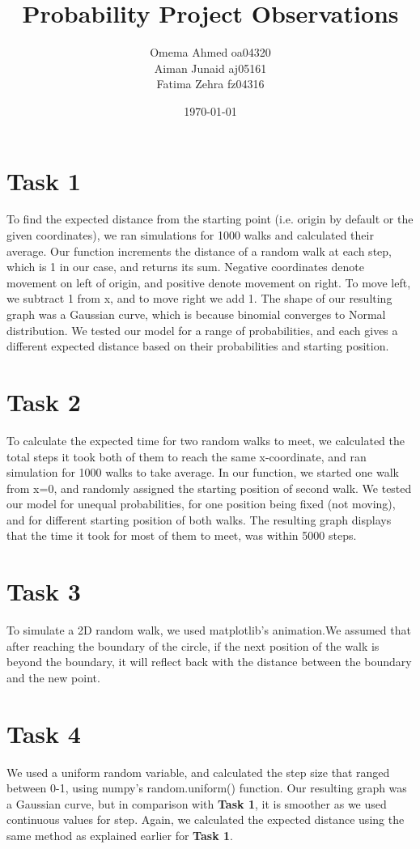 \documentclass{article}
\title{Probability Project Observations}
\author{Omema Ahmed oa04320 \\ Aiman Junaid aj05161 \\ Fatima Zehra fz04316}
\date{\today}
\begin{document}
    \maketitle
    \section*{Task 1}
    To find the expected distance from the starting point (i.e. origin by default or the given coordinates), we ran simulations for 1000 walks and calculated their average.
    Our function increments the distance of a random walk at each step, which is 1 in our case, and returns its sum. Negative coordinates denote movement on left of origin, 
    and positive denote movement on right. To move left, we subtract 1 from x, and to move right we add 1.
    The shape of our resulting graph was a Gaussian curve, which is because binomial converges to Normal distribution. %
    We tested our model for a range of probabilities, and each gives a different expected distance based on their probabilities and starting position.

    \section*{Task 2}
    To calculate the expected time for two random walks to meet, we calculated the total steps it took both of them to reach the same x-coordinate, and ran simulation for 1000 walks to take average.
    In our function, we started one walk from x=0, and randomly assigned the starting position of second walk. We tested our model for unequal probabilities, for one position being fixed (not moving), 
    and for different starting position of both walks.
    The resulting graph displays that the time it took for most of them to meet, was within 5000 steps.
    
    \section*{Task 3}
    To simulate a 2D random walk, we used matplotlib's animation.We assumed that after reaching 
    the boundary of the circle, if the next position of the walk is beyond the boundary,
    it will reflect back with the distance between the boundary and the new point.
    
    \section*{Task 4}
    We used a uniform random variable, and calculated the step size that ranged between 0-1, using numpy's random.uniform() function.
    Our resulting graph was a Gaussian curve, but in comparison with \textbf{Task 1}, it is smoother as we used continuous values for step.
    Again, we calculated the expected distance using the same method as explained earlier for \textbf{Task 1}.
\end{document}
